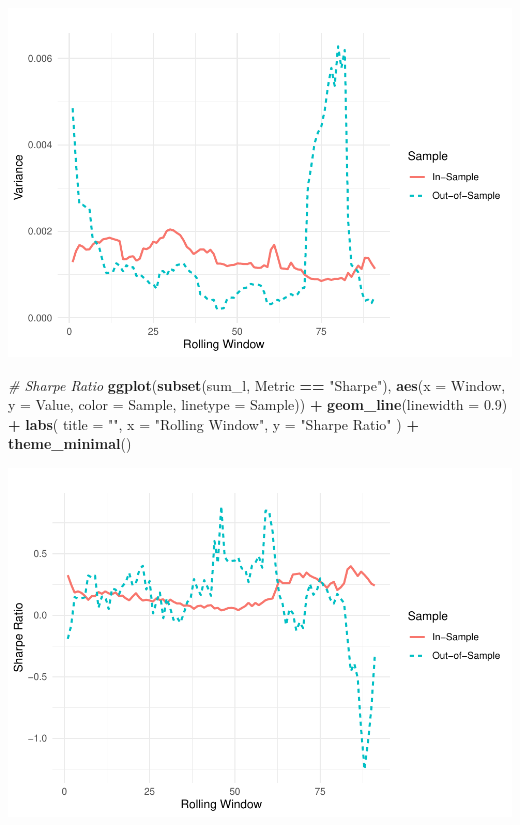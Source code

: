 \documentclass[
  12pt,
]{article}
\newenvironment{Shaded}{\begin{snugshade}}{\end{snugshade}}
\newcommand{\AttributeTok}[1]{\textcolor[rgb]{0.13,0.29,0.53}{#1}}
\newcommand{\CommentTok}[1]{\textcolor[rgb]{0.56,0.35,0.01}{\textit{#1}}}
\newcommand{\FloatTok}[1]{\textcolor[rgb]{0.00,0.00,0.81}{#1}}
\newcommand{\FunctionTok}[1]{\textcolor[rgb]{0.13,0.29,0.53}{\textbf{#1}}}
\newcommand{\NormalTok}[1]{#1}
\newcommand{\SpecialCharTok}[1]{\textcolor[rgb]{0.81,0.36,0.00}{\textbf{#1}}}
\newcommand{\StringTok}[1]{\textcolor[rgb]{0.31,0.60,0.02}{#1}}
\begin{document}
\includegraphics{NDXNES005_A2_RMD_files/figure-latex/unnamed-chunk-10-2.pdf}

\begin{Shaded}
\begin{Highlighting}[]
\CommentTok{\# Sharpe Ratio }
\FunctionTok{ggplot}\NormalTok{(}\FunctionTok{subset}\NormalTok{(sum\_l, Metric }\SpecialCharTok{==} \StringTok{"Sharpe"}\NormalTok{),}
       \FunctionTok{aes}\NormalTok{(}\AttributeTok{x =}\NormalTok{ Window, }\AttributeTok{y =}\NormalTok{ Value, }\AttributeTok{color =}\NormalTok{ Sample, }\AttributeTok{linetype =}\NormalTok{ Sample)) }\SpecialCharTok{+}
  \FunctionTok{geom\_line}\NormalTok{(}\AttributeTok{linewidth =} \FloatTok{0.9}\NormalTok{) }\SpecialCharTok{+}
  \FunctionTok{labs}\NormalTok{(}
    \AttributeTok{title =} \StringTok{""}\NormalTok{,}
    \AttributeTok{x =} \StringTok{"Rolling Window"}\NormalTok{,}
    \AttributeTok{y =} \StringTok{"Sharpe Ratio"}
\NormalTok{  ) }\SpecialCharTok{+}
  \FunctionTok{theme\_minimal}\NormalTok{()}
\end{Highlighting}
\end{Shaded}

\includegraphics{NDXNES005_A2_RMD_files/figure-latex/unnamed-chunk-10-3.pdf}
\end{document}
